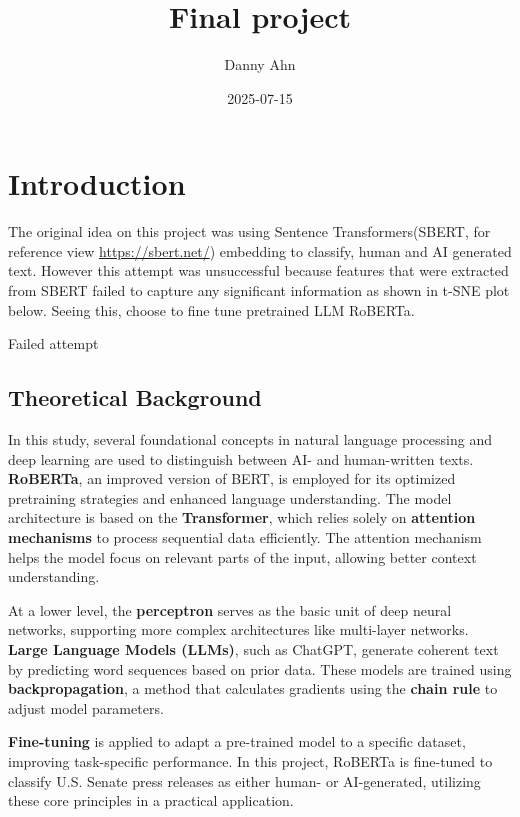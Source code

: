 \documentclass[
]{article}
\title{Final project}
\author{Danny Ahn}
\date{2025-07-15}
\makeatletter
\newcommand*\pandocbounded[1]{%
  \sbox\pandoc@box{#1}%
  \Gscale@div\@tempa{\textheight}{\dimexpr\ht\pandoc@box+\dp\pandoc@box\relax}%
  \Gscale@div\@tempb{\linewidth}{\wd\pandoc@box}%
  \ifdim\@tempb\p@<\@tempa\p@\let\@tempa\@tempb\fi%
  \ifdim\@tempa\p@<\p@\scalebox{\@tempa}{\usebox\pandoc@box}%
  \else\usebox{\pandoc@box}%
  \fi%
}
\makeatother
\begin{document}
\maketitle

\section{Introduction}\label{introduction}

The original idea on this project was using Sentence Transformers(SBERT,
for reference view \url{https://sbert.net/}) embedding to classify,
human and AI generated text. However this attempt was unsuccessful
because features that were extracted from SBERT failed to capture any
significant information as shown in t-SNE plot below. Seeing this,
choose to fine tune pretrained LLM RoBERTa.

\pandocbounded{\texttt{[image: images/TSNE\_plot.png]}}
Failed attempt

\subsection{Theoretical Background}\label{theoretical-background}

In this study, several foundational concepts in natural language
processing and deep learning are used to distinguish between AI- and
human-written texts. \textbf{RoBERTa}, an improved version of BERT, is
employed for its optimized pretraining strategies and enhanced language
understanding. The model architecture is based on the
\textbf{Transformer}, which relies solely on \textbf{attention
mechanisms} to process sequential data efficiently. The attention
mechanism helps the model focus on relevant parts of the input, allowing
better context understanding.

At a lower level, the \textbf{perceptron} serves as the basic unit of
deep neural networks, supporting more complex architectures like
multi-layer networks. \textbf{Large Language Models (LLMs)}, such as
ChatGPT, generate coherent text by predicting word sequences based on
prior data. These models are trained using \textbf{backpropagation}, a
method that calculates gradients using the \textbf{chain rule} to adjust
model parameters.

\textbf{Fine-tuning} is applied to adapt a pre-trained model to a
specific dataset, improving task-specific performance. In this project,
RoBERTa is fine-tuned to classify U.S. Senate press releases as either
human- or AI-generated, utilizing these core principles in a practical
application.
\end{document}
